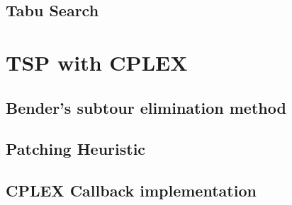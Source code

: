 \documentclass{article}
\begin{document}
\subsection{Tabu Search}


\section{TSP with CPLEX}

\subsection{Bender's subtour elimination method}

\subsection{Patching Heuristic}

\subsection{CPLEX Callback implementation}


\newpage





\end{document}
